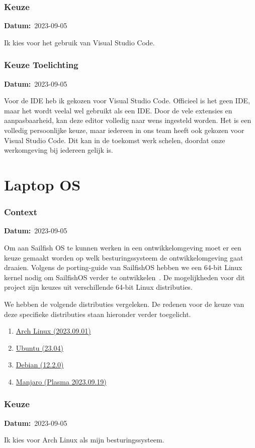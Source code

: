 \documentclass[a4paper]{report}
\newcommand{\personalbox}{
  \begin{tcolorbox}[hbox, colback=green!5!white,colframe=green!75!black,
    left=.1mm, right=.1mm, top=.1mm, bottom=.1mm, fontupper=\scriptsize\sffamily]
    Persoonlijke Keuze
  \end{tcolorbox}
}
\newcommand{\personalchoice}[1]{
  \section[ #1 ]{#1~\mbox{\raisebox{-2.5pt}{\personalbox}}}
}
\newcommand{\timestamp}[1]{
  \mbox{\scriptsize \textbf{Datum:} #1} \smallbreak
}
\begin{document}
\subsubsection{Keuze}
\timestamp{2023-09-05}
Ik kies voor het gebruik van Visual Studio Code.


\subsubsection{Keuze Toelichting}
\timestamp{2023-09-05}
Voor de IDE heb ik gekozen voor Visual Studio Code. Officieel is het geen IDE, maar het wordt veelal wel gebruikt als een IDE. 
Door de vele extensies en aanpasbaarheid, kan deze editor volledig naar wens ingesteld worden. 
Het is een volledig persoonlijke keuze, maar iedereen in ons team heeft ook gekozen voor Visual Studio Code.
Dit kan in de toekomst werk schelen, doordat onze werkomgeving bij iedereen gelijk is.

\personalchoice{Laptop OS}
\subsubsection{Context}
\timestamp{2023-09-05}
Om aan Sailfish OS te kunnen werken in een ontwikkelomgeving moet er een keuze gemaakt worden op welk besturingssysteem de ontwikkelomgeving gaat draaien. 
Volgens de porting-guide van SailfishOS hebben we een 64-bit Linux kernel nodig om SailfishOS verder te ontwikkelen~\cite{sailfishportingguide}.
De mogelijkheden voor dit project zijn keuzes uit verschillende 64-bit Linux distributies. 

We hebben de volgende distributies vergeleken. De redenen voor de keuze van deze specifieke distributies staan hieronder verder toegelicht.
\begin{enumerate}
  \item \href{https://archlinux.org/}{Arch Linux (2023.09.01)}
  \item \href{https://ubuntu.com/}{Ubuntu (23.04)}
  \item \href{https://www.debian.org/}{Debian (12.2.0)}
  \item \href{https://manjaro.org/}{Manjaro (Plasma 2023.09.19)}
\end{enumerate}

\subsubsection{Keuze}
\timestamp{2023-09-05}
Ik kies voor Arch Linux als mijn besturingssysteem.
\end{document}
